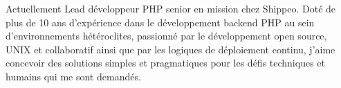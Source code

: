 

\begin{cvparagraph}

Actuellement Lead développeur PHP senior en mission chez Shippeo. \newline
Doté de plus de 10 ans d'expérience dans le développement backend PHP au sein d'environnements hétéroclites, passionné par le développement open source, UNIX et collaboratif ainsi que par les logiques de déploiement continu, j'aime concevoir des solutions simples et pragmatiques pour les défis techniques et humains qui me sont demandés.
\end{cvparagraph}
